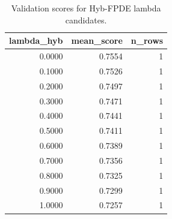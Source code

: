 \begin{table}[t]
\caption{Validation scores for Hyb-FPDE lambda candidates.}
\label{tab:lambda_distribution_computed}
\centering
\begin{tabular}{rrr}
\toprule
lambda\_hyb & mean\_score & n\_rows \\
\midrule
0.0000 & 0.7554 & 1 \\
0.1000 & 0.7526 & 1 \\
0.2000 & 0.7497 & 1 \\
0.3000 & 0.7471 & 1 \\
0.4000 & 0.7441 & 1 \\
0.5000 & 0.7411 & 1 \\
0.6000 & 0.7389 & 1 \\
0.7000 & 0.7356 & 1 \\
0.8000 & 0.7325 & 1 \\
0.9000 & 0.7299 & 1 \\
1.0000 & 0.7257 & 1 \\
\bottomrule
\end{tabular}

\end{table}
